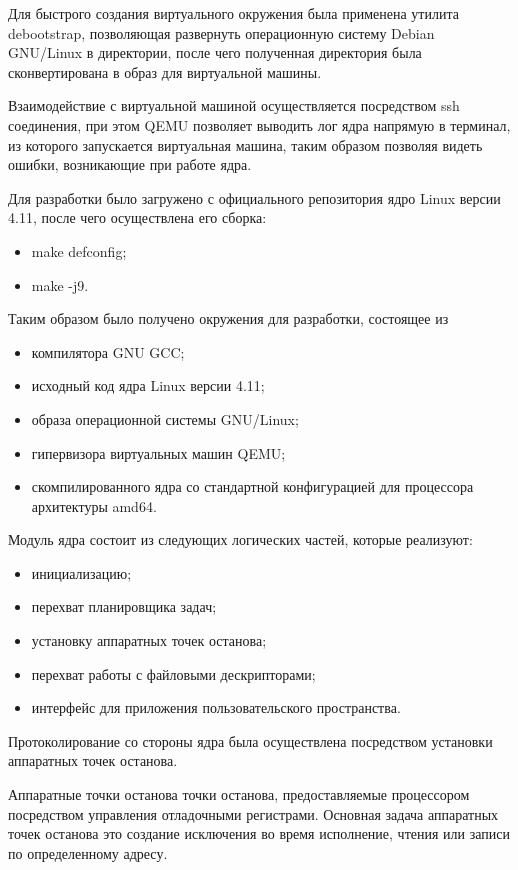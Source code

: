 \documentclass{gost7.32-2001}
\begin{document}
Для быстрого создания виртуального окружения была применена утилита
debootstrap, позволяющая развернуть операционную систему Debian
GNU/Linux в директории, после чего полученная директория была
сконвертирована в образ для виртуальной машины.

Взаимодействие с виртуальной машиной осуществляется посредством ssh
соединения, при этом QEMU позволяет выводить лог ядра напрямую в
терминал, из которого запускается виртуальная машина, таким образом
позволяя видеть ошибки, возникающие при работе ядра.

Для разработки было загружено с официального репозитория ядро Linux
версии 4.11, после чего осуществлена его сборка:
\begin{itemize}
\item
  make defconfig;
\item
  make -j9.
\end{itemize}

Таким образом было получено окружения для разработки, состоящее из
\begin{itemize}
\item
  компилятора GNU GCC;
\item
  исходный код ядра Linux версии 4.11;
\item
  образа операционной системы GNU/Linux;
\item
  гипервизора виртуальных машин QEMU;
\item
  скомпилированного ядра со стандартной конфигурацией для процессора
  архитектуры amd64.
\end{itemize}

Модуль ядра состоит из следующих логических частей, которые
реализуют:
\begin{itemize}
\item
  инициализацию;
\item
  перехват планировщика задач;
\item
  установку аппаратных точек останова;
\item
  перехват работы с файловыми дескрипторами;
\item
  интерфейс для приложения пользовательского пространства.
\end{itemize}

Протоколирование со стороны ядра была осуществлена
посредством установки аппаратных точек останова.

Аппаратные точки останова \dash точки останова, предоставляемые
процессором посредством управления отладочными регистрами. Основная
задача аппаратных точек останова это создание исключения во время
исполнение, чтения или записи по определенному адресу.
\end{document}
